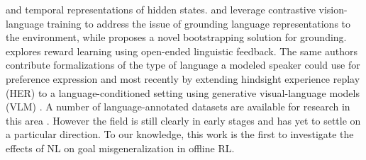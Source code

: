 \documentclass[../thesis-proposal/main.tex]{subfiles}
\begin{document}
and temporal representations of hidden states.  and
\citet{fan_minedojo_2022} leverage contrastive vision-language training to address the issue of
grounding language representations to the environment, while \citet{watkins_teachable_2021} proposes
a novel bootstrapping solution for grounding.  explores reward learning
using open-ended linguistic feedback. The same authors contribute formalizations of the type of
language a modeled speaker could use for preference expression \citep{sumers_how_2022} and most
recently by extending hindsight experience replay (HER) \citep{andrychowicz_hindsight_2017} to
a language-conditioned setting using generative visual-language models (VLM)
\citep{alayrac_flamingo_2022}. A number of language-annotated datasets are available for research in
this area \citep{zholus_iglu_2022, mees_calvin_2022, fan_minedojo_2022, shridhar_alfred_2020,
jiang_yunfan_vima_2022, liu_reinforcement_2022}. However the field is still clearly in early stages
and has yet to settle on a particular direction. To our knowledge, this work is the first to
investigate the effects of NL on goal misgeneralization in offline RL.


\ifSubfilesClassLoaded{%
  
}{}
\end{document}
